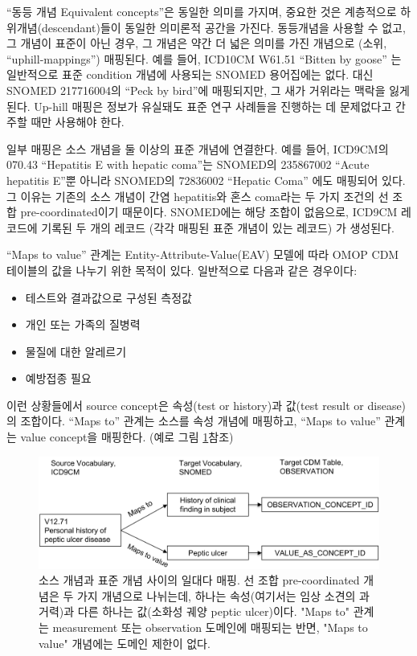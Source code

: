 \documentclass[11pt]{book}
\providecommand{\tightlist}{%
  \setlength{\itemsep}{0pt}\setlength{\parskip}{0pt}}
\theoremstyle{definition}
\theoremstyle{definition}
\theoremstyle{definition}
\theoremstyle{remark}
\begin{document}
``동등 개념 Equivalent concepts''은 동일한 의미를 가지며, 중요한 것은
계층적으로 하위개념(descendant)들이 동일한 의미론적 공간을 가진다.
동등개념을 사용할 수 없고, 그 개념이 표준이 아닌 경우, 그 개념은 약간 더
넓은 의미를 가진 개념으로 (소위, ``uphill-mappings'') 매핑된다. 예를
들어, ICD10CM W61.51 ``Bitten by goose'' 는 일반적으로 표준 condition
개념에 사용되는 SNOMED 용어집에는 없다. 대신 SNOMED 217716004의 ``Peck
by bird''에 매핑되지만, 그 새가 거위라는 맥락을 잃게 된다. Up-hill
매핑은 정보가 유실돼도 표준 연구 사례들을 진행하는 데 문제없다고 간주할
때만 사용해야 한다.

일부 매핑은 소스 개념을 둘 이상의 표준 개념에 연결한다. 예를 들어,
ICD9CM의 070.43 ``Hepatitis E with hepatic coma''는 SNOMED의 235867002
``Acute hepatitis E''뿐 아니라 SNOMED의 72836002 ``Hepatic Coma'' 에도
매핑되어 있다. 그 이유는 기존의 소스 개념이 간염 hepatitis와 혼스
coma라는 두 가지 조건의 선 조합 pre-coordinated이기 때문이다. SNOMED에는
해당 조합이 없음으로, ICD9CM 레코드에 기록된 두 개의 레코드 (각각 매핑된
표준 개념이 있는 레코드) 가 생성된다.

``Maps to value'' 관계는 Entity-Attribute-Value(EAV) 모델에 따라 OMOP
CDM 테이블의 값을 나누기 위한 목적이 있다. 일반적으로 다음과 같은
경우이다:

\begin{itemize}
\tightlist
\item
  테스트와 결과값으로 구성된 측정값
\item
  개인 또는 가족의 질병력
\item
  물질에 대한 알레르기
\item
  예방접종 필요
\end{itemize}

이런 상황들에서 source concept은 속성(test or history)과 값(test result
or disease)의 조합이다. ``Maps to'' 관계는 소스를 속성 개념에 매핑하고,
``Maps to value'' 관계는 value concept을 매핑한다. (예로 그림
\ref{fig:conceptValue}참조)

\begin{figure}

{\centering \includegraphics[width=1\linewidth]{images/StandardizedVocabularies/conceptValue} 

}

\caption{소스 개념과 표준 개념 사이의 일대다 매핑. 선 조합 pre-coordinated 개념은 두 가지 개념으로 나뉘는데, 하나는 속성(여기서는 임상 소견의 과거력)과 다른 하나는 값(소화성 궤양 peptic ulcer)이다. "Maps to" 관계는 measurement 또는 observation 도메인에 매핑되는 반면, "Maps to value" 개념에는 도메인 제한이 없다.}\label{fig:conceptValue}
\end{figure}
\end{document}
